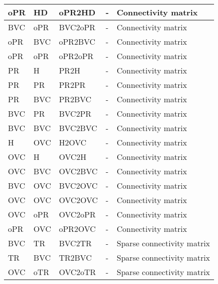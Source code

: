 \documentclass{article}
\begin{document}
\begin{xltabular}{\linewidth}{|l|l|l|X|X|}
    oPR & HD & oPR2HD & - &
    Connectivity matrix \\ \hline

    BVC & oPR & BVC2oPR & - &
    Connectivity matrix \\ \hline

    oPR & BVC & oPR2BVC & - &
    Connectivity matrix \\ \hline

    oPR & oPR & oPR2oPR & - &
    Connectivity matrix \\ \hline

    PR & H & PR2H & - &
    Connectivity matrix \\ \hline

    PR & PR & PR2PR & - &
    Connectivity matrix \\ \hline

    PR & BVC & PR2BVC & - &
    Connectivity matrix \\ \hline

    BVC & PR & BVC2PR & - &
    Connectivity matrix \\ \hline

    BVC & BVC & BVC2BVC & - &
    Connectivity matrix \\ \hline

    H & OVC & H2OVC & - &
    Connectivity matrix \\ \hline

    OVC & H & OVC2H & - &
    Connectivity matrix \\ \hline

    OVC & BVC & OVC2BVC & - &
    Connectivity matrix \\ \hline

    BVC & OVC & BVC2OVC & - &
    Connectivity matrix \\ \hline

    OVC & OVC & OVC2OVC & - &
    Connectivity matrix \\ \hline

    OVC & oPR & OVC2oPR & - &
    Connectivity matrix \\ \hline

    oPR & OVC & oPR2OVC & - &
    Connectivity matrix \\ \hline

    BVC & TR & BVC2TR & - &
    Sparse connectivity matrix \\ \hline

    TR & BVC & TR2BVC & - &
    Sparse connectivity matrix \\ \hline

    OVC & oTR & OVC2oTR & - &
    Sparse connectivity matrix \\ \hline


\end{xltabular}
\end{document}
